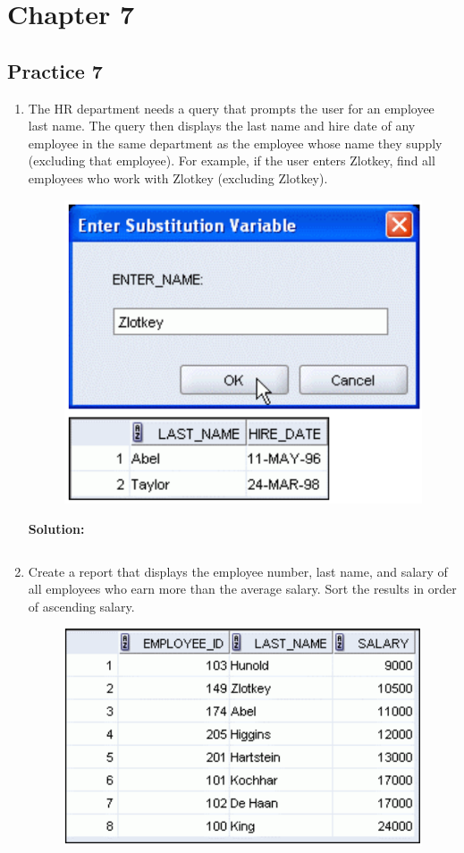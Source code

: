 \documentclass[a4paper,12pt]{article}
\begin{document}


\section*{Chapter 7}
\subsection*{Practice 7}
\begin{enumerate}
    \item The HR department needs a query that prompts the user for an employee last name. The query
then displays the last name and hire date of any employee in the same department as the
employee whose name they supply (excluding that employee). For example, if the user enters
Zlotkey, find all employees who work with Zlotkey (excluding Zlotkey).

    \begin{figure}[h]
        \centering
            \centering
            \includegraphics[width=.6\linewidth]{graphics/71.png}
    \end{figure}
    
    \textbf{Solution: }
    \begin{lstlisting}[language=SQL]

    \end{lstlisting}
        \item Create a report that displays the employee number, last name, and salary of all employees who
earn more than the average salary. Sort the results in order of ascending salary.
    \begin{figure}[h]
        \centering
            \centering
            \includegraphics[width=.6\linewidth]{graphics/72.png}
    \end{figure}
    

\end{enumerate}
\end{document}
